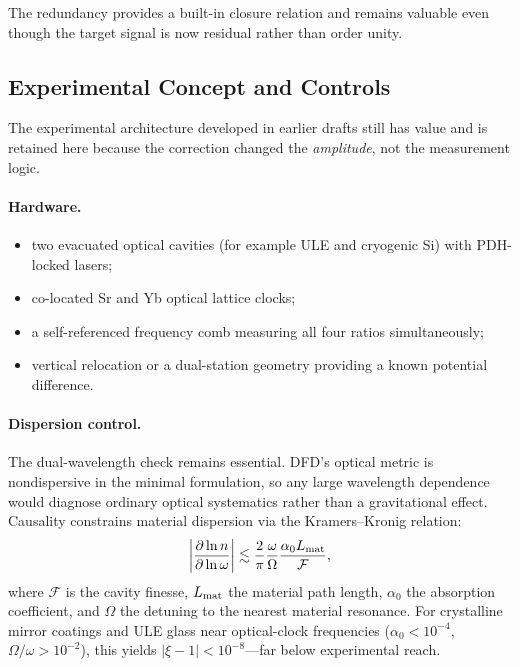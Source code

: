 The redundancy provides a built-in closure relation and remains valuable even though the target signal is now residual rather than order unity.

\subsection{Experimental Concept and Controls}\label{sec:cavity-experiment}

The experimental architecture developed in earlier drafts still has value and is retained here because the correction changed the \emph{amplitude}, not the measurement logic.

\paragraph{Hardware.}
\begin{itemize}
\item two evacuated optical cavities (for example ULE and cryogenic Si) with PDH-locked lasers;
\item co-located Sr and Yb optical lattice clocks;
\item a self-referenced frequency comb measuring all four ratios simultaneously;
\item vertical relocation or a dual-station geometry providing a known potential difference.
\end{itemize}

\paragraph{Dispersion control.}
The dual-wavelength check remains essential.  DFD's optical metric is nondispersive in the minimal formulation, so any large wavelength dependence would diagnose ordinary optical systematics rather than a gravitational effect.  Causality constrains material dispersion via the Kramers--Kronig relation:
\begin{equation}\label{eq:KK-bound}
\left|\frac{\partial\ln n}{\partial\ln\omega}\right|
 \lesssim \frac{2}{\pi}\frac{\omega}{\Omega}
           \frac{\alpha_0 L_{\rm mat}}{\mathcal{F}},
\end{equation}
where $\mathcal{F}$ is the cavity finesse, $L_{\rm mat}$ the material path length, $\alpha_0$ the absorption coefficient, and $\Omega$ the detuning to the nearest material resonance.  For crystalline mirror coatings and ULE glass near optical-clock frequencies ($\alpha_0 < 10^{-4}$, $\Omega/\omega > 10^{-2}$), this yields $|\xi - 1| < 10^{-8}$---far below experimental reach.

